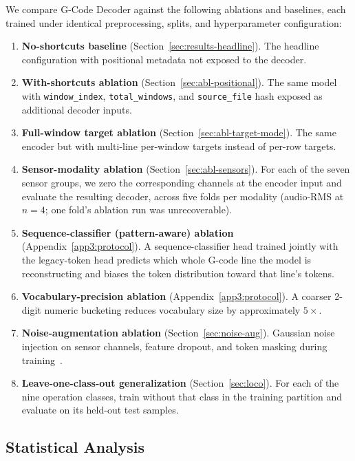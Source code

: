 \documentclass[sensors,article,submit,moreauthors,pdftex]{Definitions/mdpi}
\newcommand{\modelname}{G-Code Decoder}
\begin{document}
We compare \modelname{} against the following ablations and baselines, each trained under identical preprocessing, splits, and hyperparameter configuration:

\begin{enumerate}
\item \textbf{No-shortcuts baseline} (Section~\ref{sec:results-headline}). The headline configuration with positional metadata not exposed to the decoder.
\item \textbf{With-shortcuts ablation} (Section~\ref{sec:abl-positional}). The same model with \texttt{window\_index}, \texttt{total\_windows}, and \texttt{source\_file} hash exposed as additional decoder inputs.
\item \textbf{Full-window target ablation} (Section~\ref{sec:abl-target-mode}). The same encoder but with multi-line per-window targets instead of per-row targets.
\item \textbf{Sensor-modality ablation} (Section~\ref{sec:abl-sensors}). For each of the seven sensor groups, we zero the corresponding channels at the encoder input and evaluate the resulting decoder, across five folds per modality (audio-RMS at $n=4$; one fold's ablation run was unrecoverable).
\item \textbf{Sequence-classifier (pattern-aware) ablation} (Appendix~\ref{app3:protocol}). A sequence-classifier head trained jointly with the legacy-token head predicts which whole G-code line the model is reconstructing and biases the token distribution toward that line's tokens.
\item \textbf{Vocabulary-precision ablation} (Appendix~\ref{app3:protocol}). A coarser 2-digit numeric bucketing reduces vocabulary size by approximately $5\times$.
\item \textbf{Noise-augmentation ablation} (Section~\ref{sec:noise-aug}). Gaussian noise injection on sensor channels, feature dropout, and token masking during training~\cite{srivastava2014dropout,jia2016deep,meyes2019ablation}.
\item \textbf{Leave-one-class-out generalization} (Section~\ref{sec:loco}). For each of the nine operation classes, train without that class in the training partition and evaluate on its held-out test samples.
\end{enumerate}

\subsection{Statistical Analysis}
\label{sec:stats}
\end{document}
